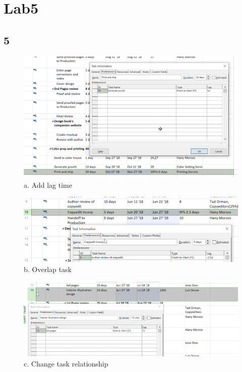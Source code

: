 \documentclass[runningheads]{llncs}
\begin{document}
\section*{Lab5}

\subsection*{5}
\begin{figure}[h]
    \centering
    \includegraphics[width=1.0\textwidth]{image/fa}
    \caption{a. Add lag time}
\end{figure}

\begin{figure}[H]
    \centering
    \includegraphics[width=1.0\textwidth]{image/fb}
    \caption{b. Overlap task}
\end{figure}

\begin{figure}[H]
    \centering
    \includegraphics[width=1.0\textwidth]{image/fc}
    \caption{c. Change task relationship}
\end{figure}
\end{document}
